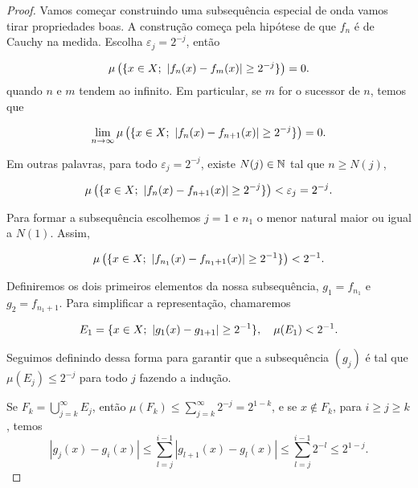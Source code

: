 \begin{proof}Vamos começar construindo uma subsequência especial de onda vamos tirar propriedades boas. A construção começa pela hipótese de que $f_n$ é de Cauchy na medida. Escolha $\varepsilon_j = 2^{-j}$, então

\begin{equation*}
    \mu\left(\{x\in X; \ \left| f_n(x)-f_m(x) \right| \geq 2^{-j}\}\right)=0.
\end{equation*}
quando $n$ e $m$ tendem ao infinito. Em particular, se $m$ for o sucessor de $n$, temos que

\begin{equation*}
    \lim_{n\rightarrow \infty}\mu\left(\{x\in X; \ \left| f_n(x)-f_{n+1}(x) \right| \geq 2^{-j}\}\right)=0.
\end{equation*}

Em outras palavras, para todo $\varepsilon_j=2^{-j}$, existe $N(j)\in\mathbb{N}$ tal que $n\geq N(j)$,

\begin{equation*}
    \mu\left(\{x\in X; \ \abs{f_n(x)-f_{n+1}(x)} \geq 2^{-j}\}\right) < \varepsilon_j = 2^{-j}.
\end{equation*}

Para formar a subsequência escolhemos $j=1$ e $n_1$ o menor natural maior ou igual a $N(1)$. Assim, 

\begin{equation*}
    \mu\left(\{x\in X; \ \abs{f_{n_1}(x)-f_{n_1+1}(x)} \geq 2^{-1}\}\right) < 2^{-1}.
\end{equation*}

Definiremos os dois primeiros elementos da nossa subsequência, $g_1=f_{n_1}$ e $g_2=f_{n_1+1}$. Para simplificar a representação, chamaremos

\begin{equation*}
    E_1=\{x\in X; \ \left| g_1(x)-g_{1+1} \right| \geq 2^{-1}\}, \quad \mu(E_1) < 2^{-1}.
\end{equation*}

Seguimos definindo dessa forma para garantir que a subsequência $(g_j)$ é tal que $\mu(E_j) \leq 2^{-j}$ para todo $j$ fazendo a indução.

Se $F_k = \bigcup_{j=k}^{\infty} E_j$, então $\mu(F_k) \leq \sum_{j=k}^{\infty} 2^{-j} = 2^{1-k}$, e se $x \notin F_k$, para $i \geq j \geq k$, temos
    \begin{equation}\label{prop:cauchy_in_measure/eq1}
        |g_j(x) - g_i(x)| \leq \sum_{l=j}^{i-1} |g_{l+1}(x) - g_l(x)| \leq \sum_{l=j}^{i-1} 2^{-l} \leq 2^{1-j}.
    \end{equation}


\end{proof}
